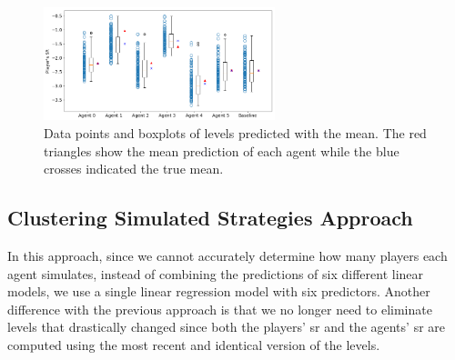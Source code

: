 \begin{figure}[h!]       
    \centering
    \includegraphics[width=0.6\textwidth]{masters-thesis-master/masters-thesis/contents/04_results/Player_Modeling/Clustering/plots/boxplot_zeros.png}
    \caption{Data points and boxplots of levels predicted with the mean. The red triangles show the mean prediction of each agent while the blue crosses indicated the true mean.}
     \label{fig:boxplot_tot}
\end{figure}

\subsection{Clustering Simulated Strategies Approach}

In this approach, since we cannot accurately determine how many players each agent simulates, instead of combining the predictions of six different linear models, we use a single linear regression model with six predictors.
Another difference with the previous approach is that we no longer need to eliminate levels that drastically changed since both the players' \acs{sr} and the agents' \acs{sr} are computed using the most recent and identical version of the levels.

